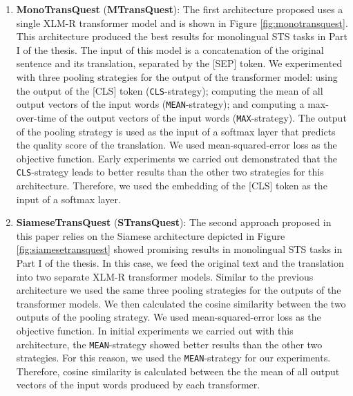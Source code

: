 \begin{enumerate}
	\item \textbf{MonoTransQuest} (\textbf{MTransQuest}): 
	The first architecture proposed uses a single XLM-R transformer model and is shown in Figure \ref{fig:monotransquest}. This architecture produced the best results for monolingual STS tasks in Part I of the thesis. The input of this model is a concatenation of the original sentence and its translation, separated by the \textsc{[SEP]} token. We experimented with three pooling strategies for the output of the transformer model: using the output of the \textsc{[CLS]} token (\texttt{CLS}-strategy); computing the mean of all output vectors of the input words (\texttt{MEAN}-strategy); and computing a max-over-time of the output vectors of the input words (\texttt{MAX}-strategy). The output of the pooling strategy is used as the input of a softmax layer that predicts the quality score of the translation. We used mean-squared-error loss as the objective function. Early experiments we carried out demonstrated that the \texttt{CLS}-strategy leads to better results than the other two strategies for this architecture. Therefore,  we used the embedding of the \textsc{[CLS]} token as the input of a softmax layer.
	
	
	\item \textbf{SiameseTransQuest} (\textbf{STransQuest}): The second approach proposed in this paper relies on the Siamese architecture depicted in Figure \ref{fig:siamesetransquest} showed promising results in monolingual STS tasks \autocite{reimers-gurevych-2019-sentence} in Part I of the thesis. In this case, we feed the original text and the translation into two separate XLM-R transformer models. Similar to the previous architecture we used the same three pooling strategies for the outputs of the transformer models. We then calculated the cosine similarity between the two outputs of the pooling strategy. We used mean-squared-error loss as the objective function. In initial experiments we carried out with this architecture, the \texttt{MEAN}-strategy showed better results than the other two strategies. For this reason, we used the \texttt{MEAN}-strategy for our experiments. Therefore, cosine similarity is calculated between the the mean of all output vectors of the input words produced by each transformer. 

	
\end{enumerate}


